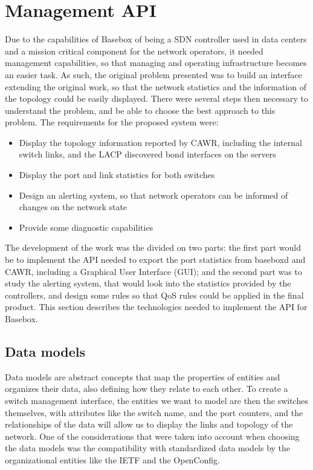 \chapter {Management API}

Due to the capabilities of Basebox of being a SDN controller used in data centers and a mission critical component for the network operators, it needed management capabilities, so that managing and operating infrastructure becomes 
an easier task. As such, the original problem presented was to build an interface extending the original work, so that the network statistics and the information of the topology could be easily displayed. There were several steps
then necessary to understand the problem, and be able to choose the best approach to this problem. The requirements for the proposed system were:

\begin {itemize}
    \item Display the topology information reported by CAWR, including the internal switch links, and the LACP discovered bond interfaces on the servers
    \item Display the port and link statistics for both switches
    \item Design an alerting system, so that network operators can be informed of changes on the network state
    \item Provide some diagnostic capabilities
\end {itemize}

\par The development of the work was the divided on two parts: the first part would be to implement the API needed to export the port statistics from baseboxd and CAWR, including a Graphical User Interface (GUI); and the second 
part was to study the alerting system, that would look into the statistics provided by the controllers, and design some rules so that QoS rules could be applied in the final product. This section describes the technologies needed 
to implement the API for Basebox.

\section {Data models}

Data models are abstract concepts that map the properties of entities and organizes their data, also defining how they relate to each other. To create a switch management interface, the entities we want to model are then 
the switches themselves, with attributes like the switch name, and the port counters, and the relationships of the data will allow us to display the links and topology of the network. One of the considerations that were taken into 
account when choosing the data models was the compatibility with standardized data models by the organizational entities like the IETF and the OpenConfig. 

